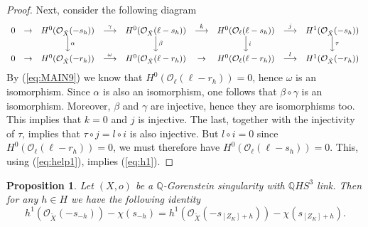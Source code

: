 \documentclass[12pt,a4paper]{amsart}
\def\cO{\mathcal{O}}
\newtheorem{prop}{Proposition}[section]
\theoremstyle{remark}
\theoremstyle{definition}
\begin{document}
\begin{proof}
Next, consider the following diagram
$$
\begin{array}{ccccccccc}
0 & \to & H^0(\cO_{{\tilde X}}(-s_h)) & \stackrel{\gamma}{\longrightarrow} &
H^0(\cO_{{\tilde X}}(\ell-s_h)) & \stackrel{k}{\longrightarrow} &
 H^0(\cO_{\ell} (\ell-s_h)) &
\stackrel{j}{\longrightarrow} & H^1(\cO_{{\tilde X}}(-s_h))\\
 & &
 \Big\downarrow\vcenter{%
 \rlap{$\scriptstyle{\alpha}$}}   & &   \Big\downarrow\vcenter{%
 \rlap{$\scriptstyle{\beta}$}} & & \Big\downarrow\vcenter{%
 \rlap{$\scriptstyle{i}$}} & & \Big\downarrow\vcenter{%
 \rlap{$\scriptstyle{\tau}$}}\\
0 & \to & H^0(\cO_{{\tilde X}}(-r_h)) & \stackrel{\omega}{\longrightarrow} &
 H^0(\cO_{{\tilde X}}(\ell-r_h)) & \to &
H^0( \cO_{\ell} (\ell-r_h)) & \stackrel{l}{\longrightarrow} & H^1(\cO_{{\tilde X}}(-r_h))
\end{array} 
$$
By (\ref{eq:MAIN9}) we know that $H^0( \cO_{\ell} (\ell-r_h))=0$, hence $\omega$ is an isomorphism. Since $\alpha$ is also an isomorphism, one follows that $\beta\circ\gamma$ is an isomorphism. Moreover, $\beta$ and $\gamma$ are injective, hence they are isomorphisms too. This implies that $k=0$ and $j$ is injective. The last, together with the injectivity of $\tau$, 
implies that $\tau\circ j=l\circ i$ is also injective. But $l\circ i=0$ since $H^0( \cO_{\ell} (\ell-r_h))=0$, we must therefore have $H^0( \cO_{\ell} (\ell-s_h))=0$. This, using (\ref{eq:help1}), implies (\ref{eq:h1}). 
\end{proof}

\begin{prop}\label{prop:dual}
Let $(X,o)$ be a $\mathbb{Q}$-Gorenstein singularity with $\mathbb{Q}HS^3$ link. Then for any $h\in H$ we have the following identity
\begin{equation}\label{eq:duality}
h^1(\cO_{{\tilde X}}(-s_{-h}))-\chi(s_{-h})=h^1(\cO_{{\tilde X}}(-s_{[Z_K]+h}))-\chi(s_{[Z_K]+h}).
\end{equation}
\end{prop}
\end{document}
